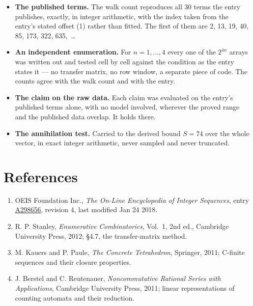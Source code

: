 \documentclass[11pt]{article}
\theoremstyle{definition}
\begin{document}
\begin{itemize}

\item {\bfseries The published terms.} The walk count reproduces all 30 terms the entry publishes, exactly, in integer arithmetic, with the index taken from the entry's stated offset (1) rather than fitted. The first of them are 2, 13, 19, 40, 85, 173, 322, 635,~\dots

\item {\bfseries An independent enumeration.} For $n = 1,\dots,4$ every one of the $2^{4n}$ arrays was written out and tested cell by cell against the condition as the entry states it --- no transfer matrix, no row window, a separate piece of code. The counts agree with the walk count and with the entry.

\item {\bfseries The claim on the raw data.} Each claim was evaluated on the entry's published terms alone, with no model involved, wherever the proved range and the published data overlap. It holds there.

\item {\bfseries The annihilation test.} Carried to the derived bound $S = 74$ over the whole vector, in exact integer arithmetic, never sampled and never truncated.

\end{itemize}

\section{References}

\begin{enumerate}

\item OEIS Foundation Inc., \emph{The On-Line Encyclopedia of Integer Sequences}, entry \href{https://oeis.org/A298656}{A298656}, revision 4, last modified Jan 24 2018.

\item R. P. Stanley, \emph{Enumerative Combinatorics}, Vol.~1, 2nd ed., Cambridge University Press, 2012; \S4.7, the transfer-matrix method.

\item M. Kauers and P. Paule, \emph{The Concrete Tetrahedron}, Springer, 2011; C-finite sequences and their closure properties.

\item J. Berstel and C. Reutenauer, \emph{Noncommutative Rational Series with Applications}, Cambridge University Press, 2011; linear representations of counting automata and their reduction.

\end{enumerate}
\end{document}
